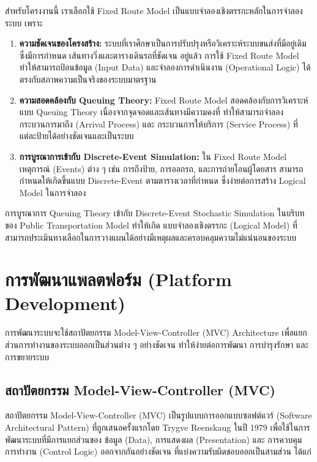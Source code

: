 \begin{mypara}
    \indent สำหรับโครงงานนี้ เราเลือกใช้ Fixed Route Model เป็นแบบจำลองเชิงตรรกะหลักในการจำลองระบบ เพราะ 
    \begin{enumerate}
        \item \textbf{ความชัดเจนของโครงสร้าง:} ระบบที่เราศึกษาเป็นการปรับปรุงหรือวิเคราะห์ระบบขนส่งที่มีอยู่เดิม ซึ่งมีการกำหนด เส้นทางวิ่งและตารางเดินรถที่ชัดเจน อยู่แล้ว การใช้ Fixed Route Model ทำให้สามารถป้อนข้อมูล (Input Data) และจำลองการดำเนินงาน (Operational Logic) ได้ตรงกับสภาพความเป็นจริงของระบบมาตรฐาน
        \item \textbf{ความสอดคล้องกับ Queuing Theory:} Fixed Route Model สอดคล้องกับการวิเคราะห์แบบ Queuing Theory เนื่องจากจุดจอดและเส้นทางมีความคงที่ ทำให้สามารถจำลอง กระบวนการมาถึง (Arrival Process) และ กระบวนการให้บริการ (Service Process) ที่แต่ละป้ายได้อย่างชัดเจนและเป็นระบบ
        \item \textbf{การบูรณาการเข้ากับ Discrete-Event Simulation:} ใน Fixed Route Model เหตุการณ์ (Events) ต่าง ๆ เช่น การถึงป้าย, การออกรถ, และการถ่ายโอนผู้โดยสาร สามารถกำหนดให้เกิดขึ้นแบบ Discrete-Event ตามตารางเวลาที่กำหนด ซึ่งง่ายต่อการสร้าง Logical Model ในการจำลอง
    \end{enumerate}
\end{mypara}

\begin{mypara}
การบูรณาการ Queuing Theory เข้ากับ Discrete-Event Stochastic Simulation ในบริบทของ Public Transportation Model ทำให้เกิด แบบจำลองเชิงตรรกะ (Logical Model) ที่สามารถประเมินทางเลือกในการวางแผนได้อย่างมีเหตุผลและครอบคลุมความไม่แน่นอนของระบบ
\end{mypara}

\section{การพัฒนาแพลตฟอร์ม (Platform Development)}
    \begin{mypara}
        \indent การพัฒนาระบบจะใช้สถาปัตยกรรม Model-View-Controller (MVC) Architecture 
        เพื่อแยกส่วนการทำงานของระบบออกเป็นส่วนต่าง ๆ อย่างชัดเจน ทำให้ง่ายต่อการพัฒนา การบำรุงรักษา และการขยายระบบ
    \end{mypara}

\subsection{สถาปัตยกรรม Model-View-Controller (MVC)}
\begin{mypara}
    \indent สถาปัตยกรรม Model-View-Controller (MVC) เป็นรูปแบบการออกแบบซอฟต์แวร์ (Software Architectural Pattern) 
    ที่ถูกเสนอครั้งแรกโดย Trygve Reenskaug ในปี 1979 เพื่อใช้ในการพัฒนาระบบที่มีการแยกส่วนของ 
    ข้อมูล (Data), การแสดงผล (Presentation) และ การควบคุมการทำงาน (Control Logic) ออกจากกันอย่างชัดเจน
    ที่แบ่งความรับผิดชอบออกเป็นสามส่วน ได้แก่ 
\end{mypara}


